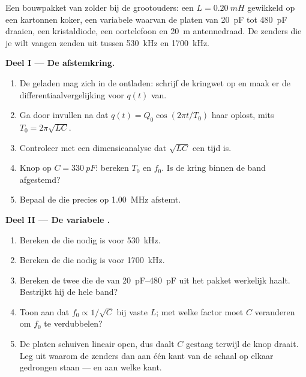 \begin{problem}
\label{pb:g12:rlc-oscillations:1}
Een bouwpakket van zolder bij de grootouders: een  $L = \qty{0.20}{mH}$
gewikkeld op een kartonnen koker, een variabele  waarvan de platen
van \qty{20}{pF} tot \qty{480}{pF} draaien, een kristaldiode, een oortelefoon
en \qty{20}{m} antennedraad. De zenders die je wilt vangen zenden uit tussen
\qty{530}{kHz} en \qty{1700}{kHz}.

\medskip
\noindent\textbf{Deel I --- De afstemkring.}
\begin{enumerate}
  \item De geladen  mag zich in de  ontladen: schrijf de
        kringwet op en maak er de differentiaalvergelijking voor $q(t)$ van.
  \item Ga door invullen na dat $q(t) = Q_0\cos(2\pi t/T_0)$ haar oplost, mits
        $T_0 = 2\pi\sqrt{LC}$.
  \item Controleer met een dimensieanalyse dat $\sqrt{LC}$ een tijd is.
  \item Knop op $C = \qty{330}{pF}$: bereken $T_0$ en $f_0$. Is de kring binnen
        de band afgestemd?
  \item Bepaal de  die precies op \qty{1.00}{MHz} afstemt.
\end{enumerate}

\medskip
\noindent\textbf{Deel II --- De variabele .}
\begin{enumerate}[resume]
  \item Bereken de  die nodig is voor \qty{530}{kHz}.
  \item Bereken de  die nodig is voor \qty{1700}{kHz}.
  \item Bereken de twee  die de  van
        \qtyrange{20}{480}{pF} uit het pakket werkelijk haalt. Bestrijkt hij de
        hele band?
  \item Toon aan dat $f_0 \propto 1/\sqrt{C}$ bij vaste $L$; met welke factor
        moet $C$ veranderen om $f_0$ te verdubbelen?
  \item De platen schuiven lineair open, dus daalt $C$ gestaag terwijl de knop
        draait. Leg uit waarom de zenders dan aan één kant van de schaal op
        elkaar gedrongen staan --- en aan welke kant.
\end{enumerate}


\end{problem}
